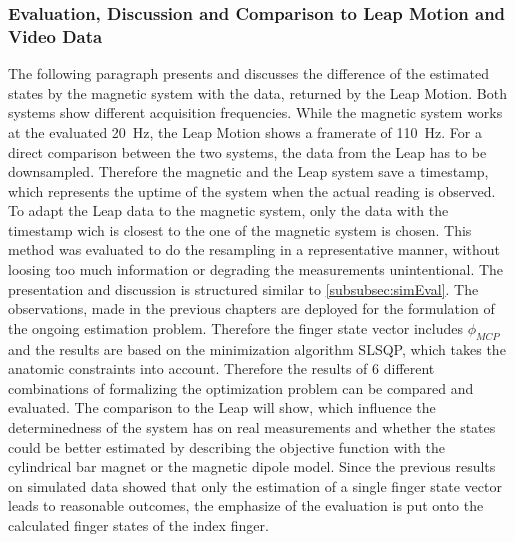 \FloatBarrier
\subsubsection{Evaluation, Discussion and Comparison to Leap Motion and Video Data}

The following paragraph presents and discusses the difference of the estimated states by the magnetic system with the data, returned by the Leap Motion. Both systems show different acquisition frequencies. While the magnetic system works at the evaluated \SI{20}{\Hz}, the Leap Motion shows a framerate of \SI{110}{\Hz}. For a direct comparison between the two systems, the data from the Leap has to be downsampled. Therefore the magnetic and the Leap system save a timestamp, which represents the uptime of the system when the actual reading is observed. To adapt the Leap data to the magnetic system, only the data with the timestamp wich is closest to the one of the magnetic system is chosen. This method was evaluated to do the resampling in a representative manner, without loosing too much information or degrading the measurements unintentional. 
The presentation and discussion is structured similar to \ref{subsubsec:simEval}. The observations, made in the previous chapters are deployed for the formulation of the ongoing estimation problem. Therefore the finger state vector includes $ \phi_{MCP} $ and the results are based on the minimization algorithm \ac{SLSQP}, which takes the anatomic constraints into account. Therefore the results of 6 different combinations of formalizing the optimization problem can be compared and evaluated. The comparison to the Leap will show, which influence the determinedness of the system has on real measurements and whether the states could be better estimated by describing the objective function with the cylindrical bar magnet or the magnetic dipole model. Since the previous results on simulated data showed that only the estimation of a single finger state vector leads to reasonable outcomes, the emphasize of the evaluation is put onto the calculated finger states of the index finger.

